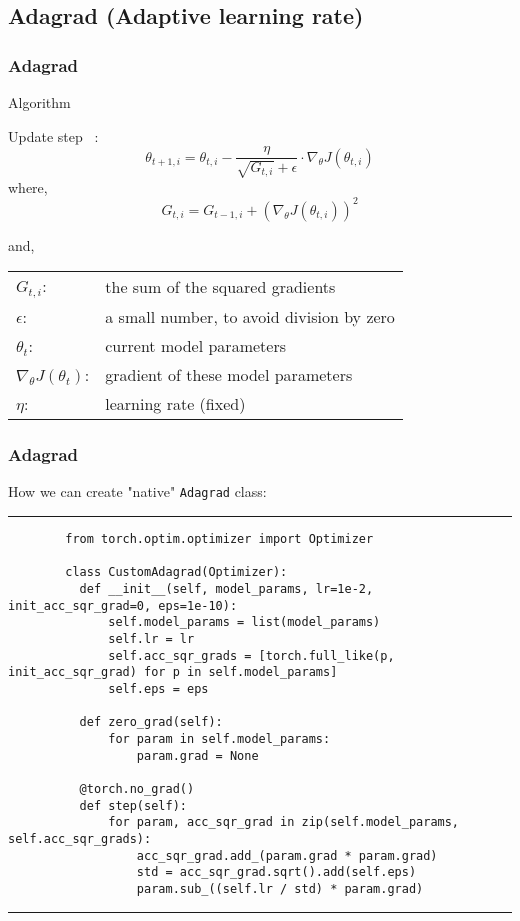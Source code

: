 \documentclass{beamer}
\begin{document}
    \subsection{Adagrad (Adaptive learning rate)}
    \begin{frame}
      \frametitle{Adagrad}
      \begin{block}{Algorithm}

        Update step ~\cite{duchi2011adaptive}:
        \begin{equation}    %
          \theta_{t+1,i} = \theta_{t,i} - \frac{\eta}{\sqrt{G_{t,i}}+ \epsilon} \cdot \nabla_{\theta}J(\theta_{t,i})
        \end{equation}
        where, \\
        \begin{equation}    %
          G_{t,i} = G_{t-1,i} + (\nabla_{\theta}J(\theta_{t,i}))^2
        \end{equation}
        

        \vskip 0.3cm
        and, \\
        \begin{tabular}{l l}
          $G_{t,i}$: & the sum of the squared gradients \\
          $\epsilon$: & a small number, to avoid division by zero\\
          $\theta_{t}$: & current model parameters \\
          $\nabla_{\theta}J(\theta_t)$: & gradient of these model parameters \\
          $\eta$: & learning rate (fixed)
        \end{tabular}
      \end{block}
    \end{frame}



    \begin{frame}[fragile]
      \frametitle{Adagrad}
      \vspace{0.2cm}
      How we can create "native" \verb|Adagrad| class:
      \rule{\textwidth}{1pt}
      \scriptsize
      \begin{verbatim}
        from torch.optim.optimizer import Optimizer

        class CustomAdagrad(Optimizer):
          def __init__(self, model_params, lr=1e-2, init_acc_sqr_grad=0, eps=1e-10):
              self.model_params = list(model_params)
              self.lr = lr
              self.acc_sqr_grads = [torch.full_like(p, init_acc_sqr_grad) for p in self.model_params]
              self.eps = eps

          def zero_grad(self):
              for param in self.model_params:
                  param.grad = None

          @torch.no_grad()
          def step(self):
              for param, acc_sqr_grad in zip(self.model_params, self.acc_sqr_grads):
                  acc_sqr_grad.add_(param.grad * param.grad)
                  std = acc_sqr_grad.sqrt().add(self.eps)
                  param.sub_((self.lr / std) * param.grad)
      \end{verbatim}
      \rule{\textwidth}{1pt}
    \end{frame}
\end{document}
